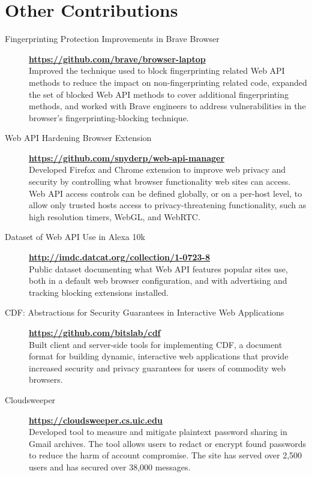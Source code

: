 \documentclass[wideaddress]{vitae}
\begin{document}
  \section{Other Contributions}
  \begin{description}

    \item[Fingerprinting Protection Improvements in Brave Browser] \hfill \textbf{\url{https://github.com/brave/browser-laptop}}\\
    Improved the technique used to block fingerprinting related Web API methods
    to reduce the impact on non-fingerprinting related code, expanded the set
    of blocked Web API methods to cover additional fingerprinting methods, and
    worked with Brave engineers to address vulnerabilities in
    the browser's fingerprinting-blocking technique.

    \item[Web API Hardening Browser Extension] \hfill \textbf{\url{https://github.com/snyderp/web-api-manager}}\\
    Developed Firefox and Chrome extension to improve web privacy and security by
    controlling what browser functionality web sites can access. Web API
    access controls can be defined globally, or on a per-host level,
    to allow only trusted hosts access to privacy-threatening
    functionality, such as high resolution timers, WebGL, and WebRTC.

    \item[Dataset of Web API Use in Alexa 10k] \hfill \textbf{\url{http://imdc.datcat.org/collection/1-0723-8}}\\
    Public dataset documenting what Web API features popular sites use,
    both in a default web browser configuration, and with
    advertising and tracking blocking extensions installed.

    \item[CDF: Abstractions for Security Guarantees in Interactive Web Applications] \hfill \textbf{\url{https://github.com/bitslab/cdf}}\\
    Built client and server-side tools for implementing CDF, a document format for building dynamic, interactive web applications
    that provide increased security and privacy guarantees for users of commodity web browsers.

    \item[Cloudsweeper] \hfill \textbf{\url{https://cloudsweeper.cs.uic.edu}}\\
    Developed tool to measure and mitigate plaintext password sharing in Gmail archives. The
    tool allows users to redact or encrypt found passwords to reduce the harm
    of account compromise. The site has served over 2,500 users and has
    secured over 38,000 messages.
  \end{description}
\end{document}
